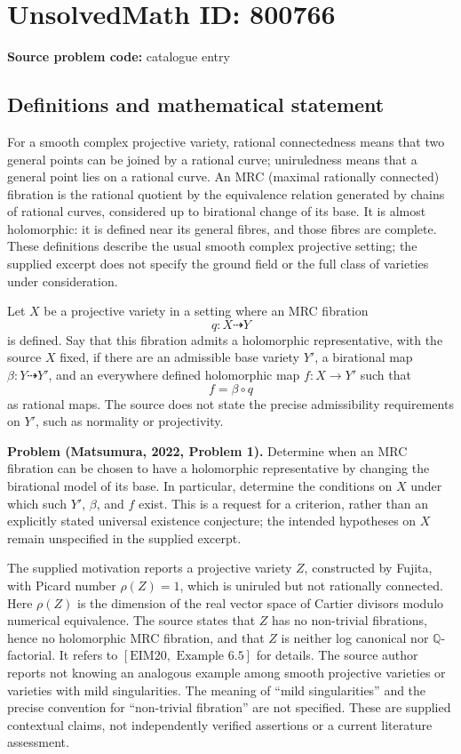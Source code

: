 \documentclass[11pt]{article}
\newcommand{\Q}{\mathbb{Q}}
\begin{document}
\section*{UnsolvedMath ID: 800766}
\textbf{Source problem code:} catalogue entry
\subsection{Definitions and mathematical statement}
For a smooth complex projective variety, rational connectedness means that two general points can be joined by a rational curve; uniruledness means that a general point lies on a rational curve. An MRC (maximal rationally connected) fibration is the rational quotient by the equivalence relation generated by chains of rational curves, considered up to birational change of its base. It is almost holomorphic: it is defined near its general fibres, and those fibres are complete. These definitions describe the usual smooth complex projective setting; the supplied excerpt does not specify the ground field or the full class of varieties under consideration.

Let \(X\) be a projective variety in a setting where an MRC fibration
\[
q\colon X\dashrightarrow Y
\]
is defined. Say that this fibration admits a holomorphic representative, with the source \(X\) fixed, if there are an admissible base variety \(Y'\), a birational map \(\beta\colon Y\dashrightarrow Y'\), and an everywhere defined holomorphic map \(f\colon X\to Y'\) such that
\[
f=\beta\circ q
\]
as rational maps. The source does not state the precise admissibility requirements on \(Y'\), such as normality or projectivity.

\textbf{Problem (Matsumura, 2022, Problem 1).} Determine when an MRC fibration can be chosen to have a holomorphic representative by changing the birational model of its base. In particular, determine the conditions on \(X\) under which such \(Y'\), \(\beta\), and \(f\) exist. This is a request for a criterion, rather than an explicitly stated universal existence conjecture; the intended hypotheses on \(X\) remain unspecified in the supplied excerpt.

The supplied motivation reports a projective variety \(Z\), constructed by Fujita, with Picard number \(\rho(Z)=1\), which is uniruled but not rationally connected. Here \(\rho(Z)\) is the dimension of the real vector space of Cartier divisors modulo numerical equivalence. The source states that \(Z\) has no non-trivial fibrations, hence no holomorphic MRC fibration, and that \(Z\) is neither log canonical nor \(\Q\)-factorial. It refers to \([\mathrm{EIM20},\text{ Example }6.5]\) for details. The source author reports not knowing an analogous example among smooth projective varieties or varieties with mild singularities. The meaning of ``mild singularities'' and the precise convention for ``non-trivial fibration'' are not specified. These are supplied contextual claims, not independently verified assertions or a current literature assessment.
\end{document}
